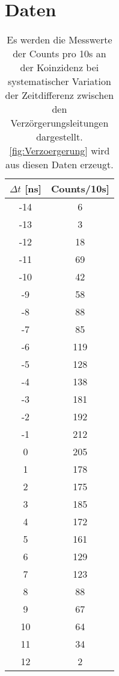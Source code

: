 \newpage
\section{Daten}
    \begin{table}[h]
        \centering
        \caption{Es werden die Messwerte der Counts pro 10s an der Koinzidenz bei systematischer Variation der Zeitdifferenz zwischen den Verzörgerungsleitungen dargestellt. \autoref{fig:Verzoergerung} wird aus diesen Daten erzeugt.}
        \label{tab:Verzoergerung}
        \begin{tabular}{c c}
        \toprule
        {$\Delta t$ [ns]} & {Counts/10s]} \\
        \midrule
        -14	& 6\\
        -13	& 3\\
        -12	& 18\\
        -11	& 69\\
        -10	& 42\\
        -9	& 58\\
        -8	& 88\\
        -7	& 85\\
        -6	& 119\\
        -5	& 128\\
        -4	& 138\\
        -3	& 181\\
        -2	& 192\\
        -1	& 212\\
        0	& 205\\
        1	& 178\\
        2	& 175\\
        3	& 185\\
        4	& 172\\
        5	& 161\\
        6	& 129\\
        7	& 123\\
        8	& 88\\
        9	& 67\\
        10	& 64\\
        11	& 34\\
        12	& 2 \\
        \bottomrule
        \end{tabular}
    \end{table}

    \FloatBarrier

